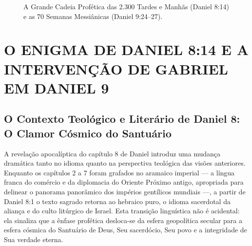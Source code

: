 \documentclass[11pt,a4paper,openany]{book}
\begin{document}
\begin{figure}[htbp]
{
}
\caption{A Grande Cadeia Profética das 2.300 Tardes e Manhãs (Daniel 8:14) e as 70 Semanas Messiânicas (Daniel 9:24--27).}
\label{fig:timeline_2300dias}
\end{figure}






\section{O ENIGMA DE DANIEL 8:14 E A INTERVENÇÃO DE GABRIEL EM DANIEL 9}



\subsection{O Contexto Teológico e Literário de Daniel 8: O Clamor Cósmico do Santuário}


A revelação apocalíptica do capítulo 8 de Daniel introduz uma mudança dramática tanto no idioma quanto na perspectiva teológica das visões anteriores. Enquanto os capítulos 2 a 7 foram grafados no aramaico imperial — a língua franca do comércio e da diplomacia do Oriente Próximo antigo, apropriada para delinear o panorama panorâmico dos impérios gentílicos mundiais —, a partir de Daniel 8:1 o texto sagrado retorna ao hebraico puro, o idioma sacerdotal da aliança e do culto litúrgico de Israel. Esta transição linguística não é acidental: ela sinaliza que a ênfase profética desloca-se da esfera geopolítica secular para a esfera cósmica do Santuário de Deus, Seu sacerdócio, Seu povo e a integridade de Sua verdade eterna.
\end{document}
